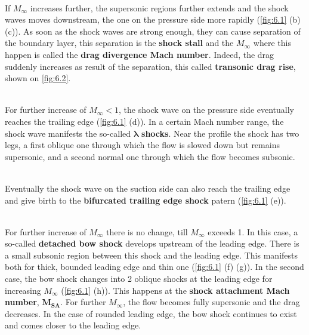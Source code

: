 	\ \\ If $M_\infty$ increases further, the supersonic regions further extends and the shock waves moves downstream, the one on the pressure side more rapidly (\autoref{fig:6.1} (b) (c)). As soon as the shock waves are strong enough, they can cause separation of the boundary layer, this separation is the \textbf{shock stall} and the $M_\infty$ where this happen is called the \textbf{drag divergence Mach number}. Indeed, the drag suddenly increases as result of the separation, this called \textbf{transonic drag rise}, shown on \autoref{fig:6.2}. 
	
	\ \\ For further increase of $M_\infty <1$, the shock wave on the pressure side eventually reaches the trailing edge (\autoref{fig:6.1} (d)). In a certain Mach number range, the shock wave manifests the so-called $\bm{\lambda}$ \textbf{shocks}. Near the profile the shock has two legs, a first oblique one through which the flow is slowed down but remains supersonic, and a second normal one through which the flow becomes subsonic. 
	
	\ \\ Eventually the shock wave on the suction side can also reach the trailing edge and give birth to the \textbf{bifurcated trailing edge shock} patern (\autoref{fig:6.1} (e)). 
	
	\ \\ For further increase of $M_\infty$ there is no change, till $M_\infty$ exceeds 1. In this case, a so-called \textbf{detached bow shock} develops upstream of the leading edge. There is a small subsonic region between this shock and the leading edge. This manifests both for thick, bounded leading edge and thin one (\autoref{fig:6.1} (f) (g)). In the second case, the bow shock changes into 2 oblique shocks at the leading edge for increasing $M_\infty$ (\autoref{fig:6.1} (h)). This happens at the \textbf{shock attachment Mach number}, $\bm{M_{SA}}$. For further $M_{\infty}$, the flow becomes fully supersonic and the drag decreases. In the case of rounded leading edge, the bow shock continues to exist and comes closer to the leading edge. 
	
